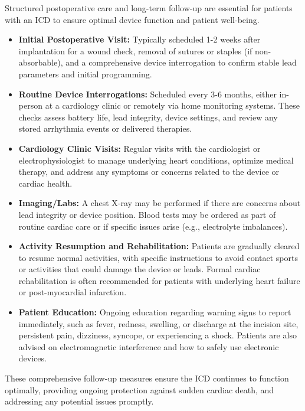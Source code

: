 Structured postoperative care and long-term follow-up are essential for patients with an ICD to ensure optimal device function and patient well-being.

\begin{itemize}
  \item \textbf{Initial Postoperative Visit:} Typically scheduled 1-2 weeks after implantation for a wound check, removal of sutures or staples (if non-absorbable), and a comprehensive device interrogation to confirm stable lead parameters and initial programming.
  
  \item \textbf{Routine Device Interrogations:} Scheduled every 3-6 months, either in-person at a cardiology clinic or remotely via home monitoring systems. These checks assess battery life, lead integrity, device settings, and review any stored arrhythmia events or delivered therapies.
  
  \item \textbf{Cardiology Clinic Visits:} Regular visits with the cardiologist or electrophysiologist to manage underlying heart conditions, optimize medical therapy, and address any symptoms or concerns related to the device or cardiac health.
  
  \item \textbf{Imaging/Labs:} A chest X-ray may be performed if there are concerns about lead integrity or device position. Blood tests may be ordered as part of routine cardiac care or if specific issues arise (e.g., electrolyte imbalances).
  
  \item \textbf{Activity Resumption and Rehabilitation:} Patients are gradually cleared to resume normal activities, with specific instructions to avoid contact sports or activities that could damage the device or leads. Formal cardiac rehabilitation is often recommended for patients with underlying heart failure or post-myocardial infarction.
  
  \item \textbf{Patient Education:} Ongoing education regarding warning signs to report immediately, such as fever, redness, swelling, or discharge at the incision site, persistent pain, dizziness, syncope, or experiencing a shock. Patients are also advised on electromagnetic interference and how to safely use electronic devices.
\end{itemize}

These comprehensive follow-up measures ensure the ICD continues to function optimally, providing ongoing protection against sudden cardiac death, and addressing any potential issues promptly.


